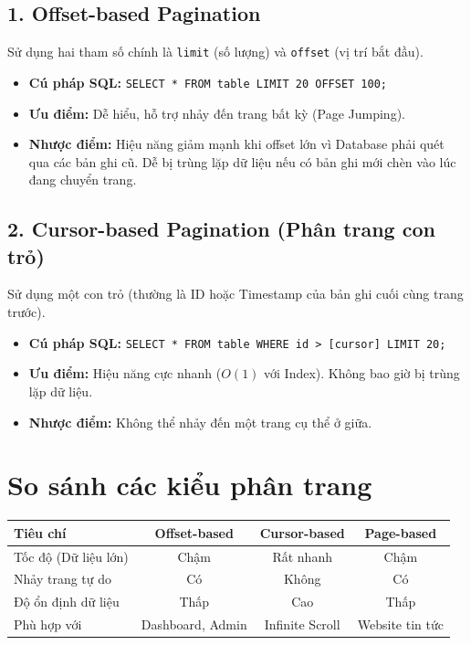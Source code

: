 \documentclass[12pt, a4paper]{article}
\begin{document}
\subsection{1. Offset-based Pagination}
Sử dụng hai tham số chính là \texttt{limit} (số lượng) và \texttt{offset} (vị trí bắt đầu).
\begin{itemize}
    \item \textbf{Cú pháp SQL:} \texttt{SELECT * FROM table LIMIT 20 OFFSET 100;}
    \item \textbf{Ưu điểm:} Dễ hiểu, hỗ trợ nhảy đến trang bất kỳ (Page Jumping).
    \item \textbf{Nhược điểm:} Hiệu năng giảm mạnh khi offset lớn vì Database phải quét qua các bản ghi cũ. Dễ bị trùng lặp dữ liệu nếu có bản ghi mới chèn vào lúc đang chuyển trang.
\end{itemize}

\subsection{2. Cursor-based Pagination (Phân trang con trỏ)}
Sử dụng một con trỏ (thường là ID hoặc Timestamp của bản ghi cuối cùng trang trước).
\begin{itemize}
    \item \textbf{Cú pháp SQL:} \texttt{SELECT * FROM table WHERE id > [cursor] LIMIT 20;}
    \item \textbf{Ưu điểm:} Hiệu năng cực nhanh ($O(1)$ với Index). Không bao giờ bị trùng lặp dữ liệu.
    \item \textbf{Nhược điểm:} Không thể nhảy đến một trang cụ thể ở giữa.
\end{itemize}

\section{So sánh các kiểu phân trang}
\begin{table}[h!]
\centering
\begin{tabular}{|l|c|c|c|}
\hline
\textbf{Tiêu chí} & \textbf{Offset-based} & \textbf{Cursor-based} & \textbf{Page-based} \\ \hline
Tốc độ (Dữ liệu lớn) & Chậm & Rất nhanh & Chậm \\ \hline
Nhảy trang tự do & Có & Không & Có \\ \hline
Độ ổn định dữ liệu & Thấp & Cao & Thấp \\ \hline
Phù hợp với & Dashboard, Admin & Infinite Scroll & Website tin tức \\ \hline
\end{tabular}
\end{table}
\end{document}
